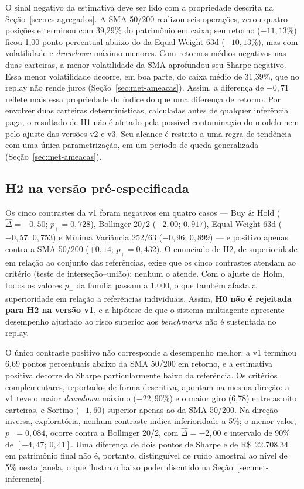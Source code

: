 O sinal negativo da estimativa deve ser lido com a propriedade descrita na Seção~\ref{sec:res-agregados}. A SMA 50/200 realizou seis operações, zerou quatro posições e terminou com 39,29\% do patrimônio em caixa; seu retorno ($-11{,}13\%$) ficou 1,00 ponto percentual abaixo do da Equal Weight 63d ($-10{,}13\%$), mas com volatilidade e \textit{drawdown} máximo menores. Com retornos médios negativos nas duas carteiras, a menor volatilidade da SMA aprofundou seu Sharpe negativo. Essa menor volatilidade decorre, em boa parte, do caixa médio de 31,39\%, que no replay não rende juros (Seção~\ref{sec:met-ameacas}). Assim, a diferença de $-0{,}71$ reflete mais essa propriedade do índice do que uma diferença de retorno. Por envolver duas carteiras determinísticas, calculadas antes de qualquer inferência paga, o resultado de H1 não é afetado pela possível contaminação do modelo nem pelo ajuste das versões v2 e v3. Seu alcance é restrito a uma regra de tendência com uma única parametrização, em um período de queda generalizada (Seção~\ref{sec:met-ameacas}).

\subsection{H2 na versão pré-especificada}
\label{sec:res-h2}

Os cinco contrastes da v1 foram negativos em quatro casos --- Buy \& Hold ($\hat{\Delta} = -0{,}50$; $p_{+} = 0{,}728$), Bollinger 20/2 ($-2{,}00$; $0{,}917$), Equal Weight 63d ($-0{,}57$; $0{,}753$) e Mínima Variância 252/63 ($-0{,}96$; $0{,}899$) --- e positivo apenas contra a SMA 50/200 ($+0{,}14$; $p_{+} = 0{,}432$). O enunciado de H2, de superioridade em relação ao conjunto das referências, exige que os cinco contrastes atendam ao critério (teste de interseção--união); nenhum o atende. Com o ajuste de Holm, todos os valores $p_{+}$ da família passam a 1,000, o que também afasta a superioridade em relação a referências individuais. Assim, \textbf{H0 não é rejeitada para H2 na versão v1}, e a hipótese de que o sistema multiagente apresente desempenho ajustado ao risco superior aos \textit{benchmarks} não é sustentada no replay.

O único contraste positivo não corresponde a desempenho melhor: a v1 terminou 6,69 pontos percentuais abaixo da SMA 50/200 em retorno, e a estimativa positiva decorre do Sharpe particularmente baixo da referência. Os critérios complementares, reportados de forma descritiva, apontam na mesma direção: a v1 teve o maior \textit{drawdown} máximo ($-22{,}90\%$) e o maior giro (6,78) entre as oito carteiras, e Sortino ($-1{,}60$) superior apenas ao da SMA 50/200. Na direção inversa, exploratória, nenhum contraste indica inferioridade a 5\%; o menor valor, $p_{-} = 0{,}084$, ocorre contra a Bollinger 20/2, com $\hat{\Delta} = -2{,}00$ e intervalo de 90\% de $[-4{,}47;\ 0{,}41]$. Uma diferença de dois pontos de Sharpe e de R\$~22.708,34 em patrimônio final não é, portanto, distinguível de ruído amostral ao nível de 5\% nesta janela, o que ilustra o baixo poder discutido na Seção~\ref{sec:met-inferencia}.

